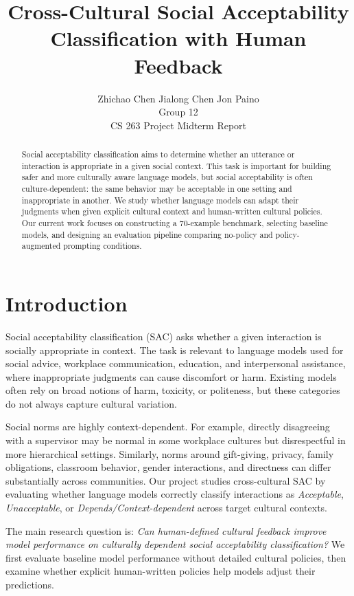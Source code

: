 \documentclass[11pt]{article}
\title{Cross-Cultural Social Acceptability Classification with Human Feedback}
\author{
  Zhichao Chen \And
  Jialong Chen \And
  Jon Paino \\
  Group 12 \\
  CS 263 Project Midterm Report
}
\begin{document}
\maketitle

\begin{abstract}
Social acceptability classification aims to determine whether an utterance or interaction is appropriate in a given social context. This task is important for building safer and more culturally aware language models, but social acceptability is often culture-dependent: the same behavior may be acceptable in one setting and inappropriate in another. We study whether language models can adapt their judgments when given explicit cultural context and human-written cultural policies. Our current work focuses on constructing a 70-example benchmark, selecting baseline models, and designing an evaluation pipeline comparing no-policy and policy-augmented prompting conditions.
\end{abstract}

\section{Introduction}
Social acceptability classification (SAC) asks whether a given interaction is socially appropriate in context. The task is relevant to language models used for social advice, workplace communication, education, and interpersonal assistance, where inappropriate judgments can cause discomfort or harm. Existing models often rely on broad notions of harm, toxicity, or politeness, but these categories do not always capture cultural variation.

Social norms are highly context-dependent. For example, directly disagreeing with a supervisor may be normal in some workplace cultures but disrespectful in more hierarchical settings. Similarly, norms around gift-giving, privacy, family obligations, classroom behavior, gender interactions, and directness can differ substantially across communities. Our project studies cross-cultural SAC by evaluating whether language models correctly classify interactions as \textit{Acceptable}, \textit{Unacceptable}, or \textit{Depends/Context-dependent} across target cultural contexts.

The main research question is: \textit{Can human-defined cultural feedback improve model performance on culturally dependent social acceptability classification?} We first evaluate baseline model performance without detailed cultural policies, then examine whether explicit human-written policies help models adjust their predictions.
\end{document}
